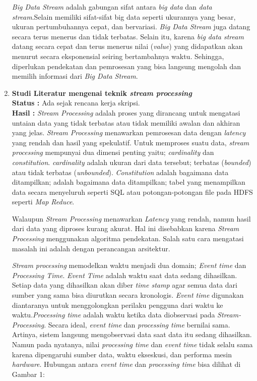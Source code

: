 \documentclass[a4paper,twoside]{article}
\begin{document}
\begin{enumerate}
		\textit{Big Data Stream} adalah gabungan sifat antara \textit{big data} dan \textit{data 				stream}.Selain memiliki sifat-sifat big data seperti ukurannya yang besar, ukuran 						pertumbuhannya cepat, dan bervariasi. \textit{Big Data Stream} juga datang secara terus
		menerus dan tidak terbatas. Selain itu, karena \textit{big data stream} datang secara 
		cepat dan terus menerus nilai (\textit{value}) yang didapatkan akan menurut secara 						eksponensial seiring bertambahnya waktu. Sehingga, diperlukan pendekatan dan pemrosesan
		yang bisa langsung mengolah dan memilih informasi dari \textit{Big Data Stream}.
		
		\item \textbf{Studi Literatur mengenai teknik \textit{stream processing}}\\
		{\bf Status :} Ada sejak rencana kerja skripsi.\\
		{\bf Hasil :} \textit{Stream Processing} adalah proses yang dirancang untuk mengatasi 					untaian data yang tidak terbatas atau tidak memiliki awalan dan akhiran yang jelas.
		\textit{Stream Processing} menawarkan pemrosesan data dengan \textit{latency} yang rendah
		dan hasil yang spekulatif. Untuk memproses suatu data, \textit{stream processing} mempunyai 			dua dimensi penting yaitu; \textit{cardinality} dan \textit{constitution}. 								\textit{cardinality} adalah ukuran dari data tersebut; terbatas (\textit{bounded}) atau 				tidak terbatas (\textit{unbounded}). \textit{Constitution} adalah bagaimana data 						ditampilkan; adalah bagaimana data ditampilkan; tabel yang menampilkan data secara 						menyeluruh seperti SQL atau potongan-potongan file pada HDFS seperti \textit{Map Reduce}.
		
		Walaupun \textit{Stream Processing} menawarkan \textit{Latency} yang rendah, namun hasil 				dari data yang diproses kurang akurat. Hal ini disebabkan karena \textit{Stream Processing}
		menggunakan algoritma pendekatan. Salah satu cara mengatasi masalah ini adalah dengan 					perancangan arsitektur.
		
		\textit{Stream processing} memodelkan waktu menjadi dua domain; \textit{Event time} dan 				\textit{Processing Time}. \textit{Event Time} adalah waktu saat data sedang dihasilkan. 				Setiap data yang dihasilkan akan diber \textit{time stamp} agar semua data dari sumber yang 			sama bisa diurutkan secara kronologis. \textit{Event time} digunakan diantaranya untuk 					menggolongkan perilaku pengguna dari waktu ke waktu.\textit{Processing time} adalah waktu 				ketika data diobservasi pada \textit{Stream-Processing}. Secara ideal, \textit{event time} 				dan \textit{processing time} bernilai sama. Artinya, sistem langsung mengobservasi data saat 		data itu sedang dihasilkan. Namun pada nyatanya, nilai \textit{processing time} dan 					\textit{event time} tidak selalu sama karena dipengaruhi sumber data, waktu ekseskusi, dan 				performa mesin \textit{hardware}. Hubungan antara \textit{event time} dan \textit{processing 		time} bisa dilihat di Gambar 1:
		

\end{enumerate}
\end{document}

